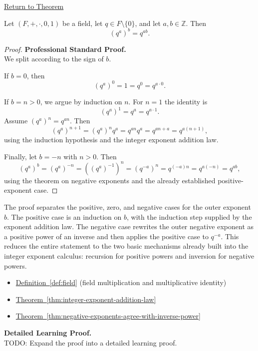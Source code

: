 \newpage
{}
\label{prf:power-of-a-power-in-field}

\begin{remark*}[Return]
\hyperref[thm:power-of-a-power-in-field]{Return to Theorem}
\end{remark*}

\begin{theorem*}
Let $(F,+,\cdot,0,1)$ be a field, let $q\in F\setminus\{0\}$, and let
$a,b\in\mathbb{Z}$. Then
\[
(q^a)^b=q^{ab}.
\]
\end{theorem*}

\begin{proof}
\textbf{Professional Standard Proof.}~\\
We split according to the sign of $b$.

If $b=0$, then
\[
(q^a)^0=1=q^0=q^{a\cdot 0}.
\]

If $b=n>0$, we argue by induction on $n$.  For $n=1$ the identity is
\[
(q^a)^1=q^a=q^{a\cdot 1}.
\]
Assume $(q^a)^n=q^{an}$.  Then
\[
(q^a)^{n+1}=(q^a)^n q^a=q^{an}q^a=q^{an+a}=q^{a(n+1)},
\]
using the induction hypothesis and the integer exponent addition law.

Finally, let $b=-n$ with $n>0$.  Then
\[
(q^a)^b=(q^a)^{-n}=((q^a)^{-1})^n=(q^{-a})^n=q^{(-a)n}=q^{a(-n)}=q^{ab},
\]
using the theorem on negative exponents and the already established
positive-exponent case.
\end{proof}

\begin{remark*}
The proof separates the positive, zero, and negative cases for the outer
exponent $b$.  The positive case is an induction on $b$, with the induction
step supplied by the exponent addition law.  The negative case rewrites the
outer negative exponent as a positive power of an inverse and then applies
the positive case to $q^{-a}$.  This reduces the entire statement to the two
basic mechanisms already built into the integer exponent calculus: recursion
for positive powers and inversion for negative powers.
\end{remark*}

\begin{dependencies}
\begin{itemize}
  \item \hyperref[def:field]{Definition~\ref*{def:field}}
        \textnormal{(field multiplication and multiplicative identity)}
  \item \hyperref[thm:integer-exponent-addition-law]{Theorem~\ref*{thm:integer-exponent-addition-law}}
  \item \hyperref[thm:negative-exponents-agree-with-inverse-power]{Theorem~\ref*{thm:negative-exponents-agree-with-inverse-power}}
\end{itemize}
\end{dependencies}

\textbf{Detailed Learning Proof.}~\\
TODO: Expand the proof into a detailed learning proof.

